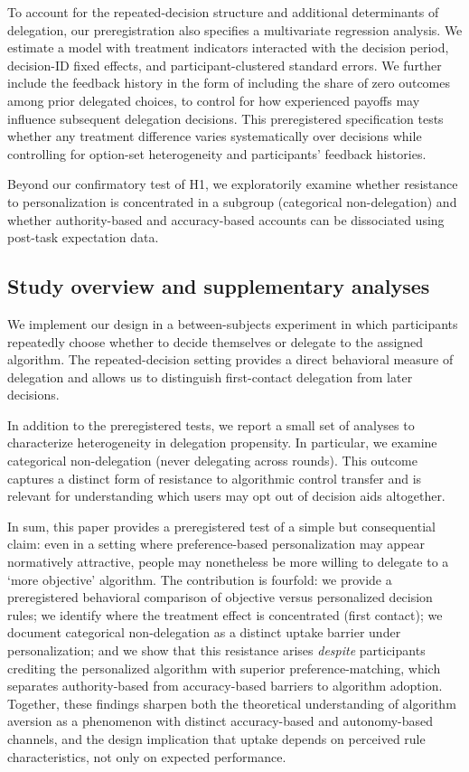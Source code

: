\documentclass[a4paper, 12pt, fleqn]{article}
\theoremstyle{definition}
\begin{document}
To account for the repeated-decision structure and additional determinants of delegation, our preregistration also specifies a multivariate regression analysis. We estimate a model with treatment indicators interacted with the decision period, decision-ID fixed effects, and participant-clustered standard errors. We further include the feedback history in the form of including the share of zero outcomes among prior delegated choices, to control for how experienced payoffs may influence subsequent delegation decisions. This preregistered specification tests whether any treatment difference varies systematically over decisions while controlling for option-set heterogeneity and participants' feedback histories.

Beyond our confirmatory test of H1, we exploratorily examine whether resistance to personalization is concentrated in a subgroup (categorical non-delegation) and whether authority-based and accuracy-based accounts can be dissociated using post-task expectation data.

\subsection*{Study overview and supplementary analyses}
We implement our design in a between-subjects experiment in which participants repeatedly choose whether to decide themselves or delegate to the assigned algorithm. The repeated-decision setting provides a direct behavioral measure of delegation and allows us to distinguish first-contact delegation from later decisions.

In addition to the preregistered tests, we report a small set of analyses to characterize heterogeneity in delegation propensity. In particular, we examine categorical non-delegation (never delegating across rounds). This outcome captures a distinct form of resistance to algorithmic control transfer and is relevant for understanding which users may opt out of decision aids altogether.

In sum, this paper provides a preregistered test of a simple but consequential claim: even in a setting where preference-based personalization may appear normatively attractive, people may nonetheless be more willing to delegate to a `more objective' algorithm. The contribution is fourfold: we provide a preregistered behavioral comparison of objective versus personalized decision rules; we identify where the treatment effect is concentrated (first contact); we document categorical non-delegation as a distinct uptake barrier under personalization; and we show that this resistance arises \emph{despite} participants crediting the personalized algorithm with superior preference-matching, which separates authority-based from accuracy-based barriers to algorithm adoption. Together, these findings sharpen both the theoretical understanding of algorithm aversion as a phenomenon with distinct accuracy-based and autonomy-based channels, and the design implication that uptake depends on perceived rule characteristics, not only on expected performance.
\end{document}
